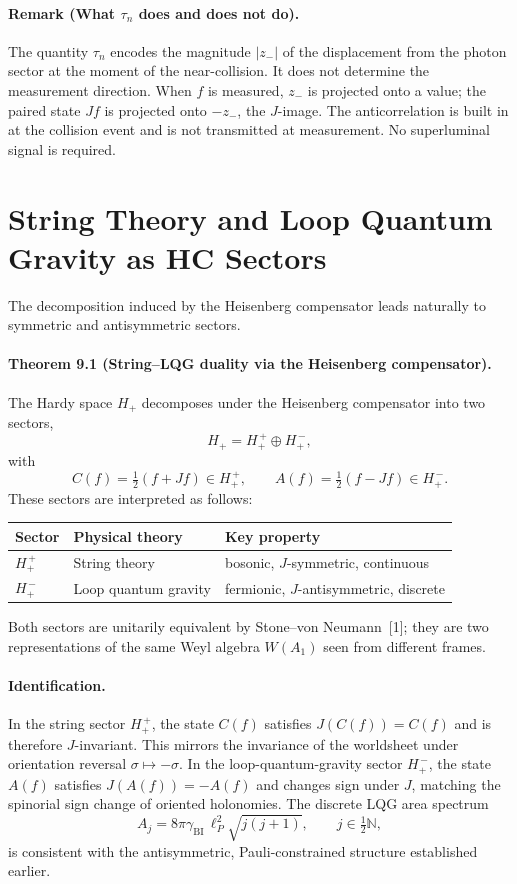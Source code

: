 \documentclass[12pt,a4paper]{article}
\begin{document}
\paragraph*{Remark (What $\tau_n$ does and does not do).}
The quantity $\tau_n$ encodes the magnitude $|z_-|$ of the displacement from the photon sector at the moment of the near-collision. It does not determine the measurement direction. When $f$ is measured, $z_-$ is projected onto a value; the paired state $Jf$ is projected onto $-z_-$, the $J$-image. The anticorrelation is built in at the collision event and is not transmitted at measurement. No superluminal signal is required.

\section{String Theory and Loop Quantum Gravity as HC Sectors}
The decomposition induced by the Heisenberg compensator leads naturally to symmetric and antisymmetric sectors.

\paragraph*{Theorem 9.1 (String--LQG duality via the Heisenberg compensator).}
The Hardy space $H_+$ decomposes under the Heisenberg compensator into two sectors,
\[
H_+ = H_+^{\,+} \oplus H_+^{\,-},
\]
with
\[
C(f)=\tfrac12(f+Jf) \in H_+^{\,+}, \qquad A(f)=\tfrac12(f-Jf) \in H_+^{\,-}.
\]
These sectors are interpreted as follows:
\begin{center}
\begin{tabular}{lll}
\toprule
Sector & Physical theory & Key property \\
\midrule
$H_+^{\,+}$ & String theory & bosonic, $J$-symmetric, continuous \\
$H_+^{\,-}$ & Loop quantum gravity & fermionic, $J$-antisymmetric, discrete \\
\bottomrule
\end{tabular}
\end{center}
Both sectors are unitarily equivalent by Stone--von Neumann~[1]; they are two representations of the same Weyl algebra $W(A_1)$ seen from different frames.

\paragraph*{Identification.}
In the string sector $H_+^{\,+}$, the state $C(f)$ satisfies $J(C(f))=C(f)$ and is therefore $J$-invariant. This mirrors the invariance of the worldsheet under orientation reversal $\sigma \mapsto -\sigma$. In the loop-quantum-gravity sector $H_+^{\,-}$, the state $A(f)$ satisfies $J(A(f))=-A(f)$ and changes sign under $J$, matching the spinorial sign change of oriented holonomies. The discrete LQG area spectrum
\[
A_j = 8\pi \gamma_{\mathrm{BI}} \, \ell_P^2 \sqrt{j(j+1)}, \qquad j \in \tfrac12\mathbb{N},
\]
is consistent with the antisymmetric, Pauli-constrained structure established earlier.
\end{document}
